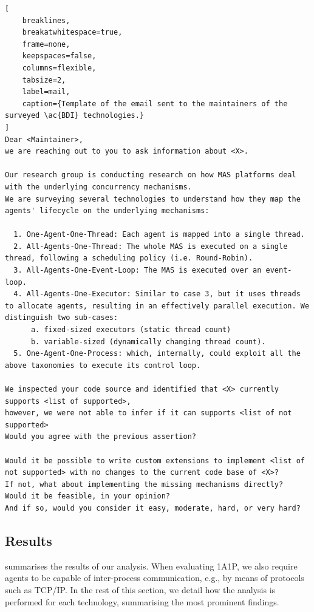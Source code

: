 \begin{lstlisting}[
    breaklines, 
    breakatwhitespace=true, 
    frame=none, 
    keepspaces=false, 
    columns=flexible, 
    tabsize=2,
    label=mail,
    caption={Template of the email sent to the maintainers of the surveyed \ac{BDI} technologies.}
]
Dear <Maintainer>,
we are reaching out to you to ask information about <X>.

Our research group is conducting research on how MAS platforms deal with the underlying concurrency mechanisms.
We are surveying several technologies to understand how they map the agents' lifecycle on the underlying mechanisms:

  1. One-Agent-One-Thread: Each agent is mapped into a single thread.
  2. All-Agents-One-Thread: The whole MAS is executed on a single thread, following a scheduling policy (i.e. Round-Robin).
  3. All-Agents-One-Event-Loop: The MAS is executed over an event-loop.
  4. All-Agents-One-Executor: Similar to case 3, but it uses threads to allocate agents, resulting in an effectively parallel execution. We distinguish two sub-cases:
      a. fixed-sized executors (static thread count)
      b. variable-sized (dynamically changing thread count).
  5. One-Agent-One-Process: which, internally, could exploit all the above taxonomies to execute its control loop.

We inspected your code source and identified that <X> currently supports <list of supported>,
however, we were not able to infer if it can supports <list of not supported>
Would you agree with the previous assertion?

Would it be possible to write custom extensions to implement <list of not supported> with no changes to the current code base of <X>?
If not, what about implementing the missing mechanisms directly?
Would it be feasible, in your opinion?
And if so, would you consider it easy, moderate, hard, or very hard?
\end{lstlisting}

\subsection{Results}
\label{subsec:results}

 summarises the results of our analysis.
When evaluating \ac{1A1P}, we also require agents to be capable of inter-process communication,
e.g., by means of protocols such as TCP/IP\@.
%
In the rest of this section,
we detail how the analysis is performed for each technology,
summarising the most prominent findings.

